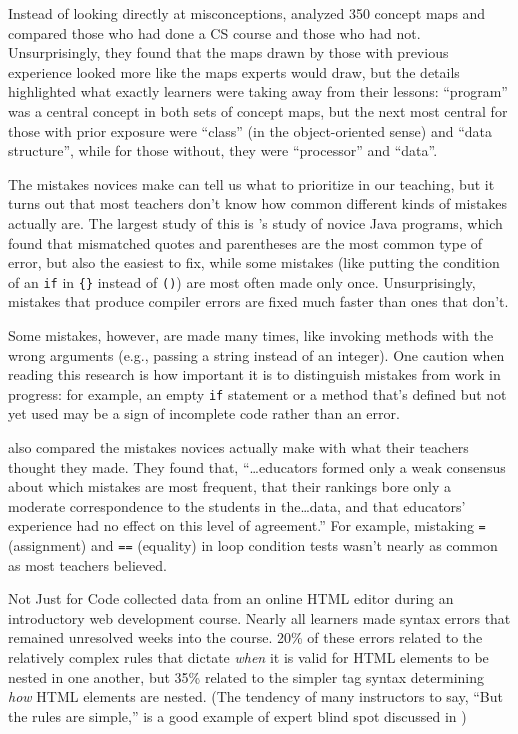 Instead of looking directly at misconceptions, \cite{Muhl2016} analyzed 350 concept maps and compared those who had done a CS course and those who had not. Unsurprisingly, they found that the maps drawn by those with previous experience looked more like the maps experts would draw, but the details highlighted what exactly learners were taking away from their lessons: ``program'' was a central concept in both sets of concept maps, but the next most central for those with prior exposure were ``class'' (in the object-oriented sense) and ``data structure'', while for those without, they were ``processor'' and ``data''.


The mistakes novices make can tell us what to prioritize in our teaching, but it turns out that most teachers don't know how common different kinds of mistakes actually are. The largest study of this is \cite{Brow2017}'s study of novice Java programs, which found that mismatched quotes and parentheses are the most common type of error, but also the easiest to fix, while some mistakes (like putting the condition of an \texttt{if} in \texttt{\{\}} instead of \texttt{()}) are most often made only once. Unsurprisingly, mistakes that produce compiler errors are fixed much faster than ones that don't.

Some mistakes, however, are made many times, like invoking methods with the wrong arguments (e.g., passing a string instead of an integer). One caution when reading this research is how important it is to distinguish mistakes from work in progress: for example, an empty \texttt{if} statement or a method that's defined but not yet used may be a sign of incomplete code rather than an error.

\cite{Brow2017} also compared the mistakes novices actually make with what their teachers thought they made. They found that, ``{\ldots}educators formed only a weak consensus about which mistakes are most frequent, that their rankings bore only a moderate correspondence to the students in the{\ldots}data, and that educators' experience had no effect on this level of agreement.'' For example, mistaking \texttt{=} (assignment) and \texttt{==} (equality) in loop condition tests wasn't nearly as common as most teachers believed.

\begin{aside}{Not Just for Code}
  \cite{Park2015} collected data from an online HTML editor during an introductory web development course. Nearly all learners made syntax errors that remained unresolved weeks into the course. 20\% of these errors related to the relatively complex rules that dictate \emph{when} it is valid for HTML elements to be nested in one another, but 35\% related to the simpler tag syntax determining \emph{how} HTML elements are nested. (The tendency of many instructors to say, ``But the rules are simple,'' is a good example of expert blind spot discussed in )
\end{aside}

